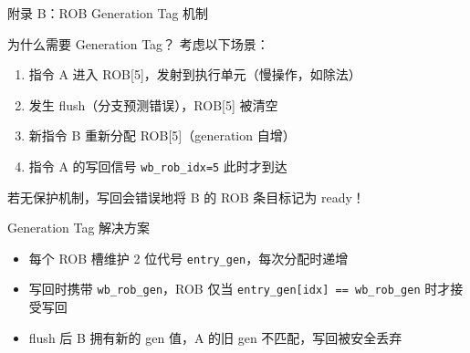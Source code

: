 \documentclass[aspectratio=169,xcolor={dvipsnames,svgnames},10pt]{beamer}
\newcommand{\code}[1]{\texttt{\small\color{PrimaryBlue}#1}}
\begin{document}
\begin{frame}{附录 B：ROB Generation Tag 机制}
  \begin{exampleblock}{为什么需要 Generation Tag？}
    \small
    考虑以下场景：
    \begin{enumerate}
      \item 指令 A 进入 ROB[5]，发射到执行单元（慢操作，如除法）
      \item 发生 flush（分支预测错误），ROB[5] 被清空
      \item 新指令 B 重新分配 ROB[5]（generation 自增）
      \item 指令 A 的写回信号 \code{wb\_rob\_idx=5} 此时才到达
    \end{enumerate}
    \vspace{0.1cm}
    若无保护机制，写回会错误地将 B 的 ROB 条目标记为 ready！
  \end{exampleblock}
  \vspace{0.2cm}
  \begin{block}{Generation Tag 解决方案}
    \small
    \begin{itemize}
      \item 每个 ROB 槽维护 2 位代号 \code{entry\_gen}，每次分配时递增
      \item 写回时携带 \code{wb\_rob\_gen}，ROB 仅当
            \code{entry\_gen[idx] == wb\_rob\_gen} 时才接受写回
      \item flush 后 B 拥有新的 gen 值，A 的旧 gen 不匹配，写回被安全丢弃
    \end{itemize}
  \end{block}
\end{frame}
\end{document}
